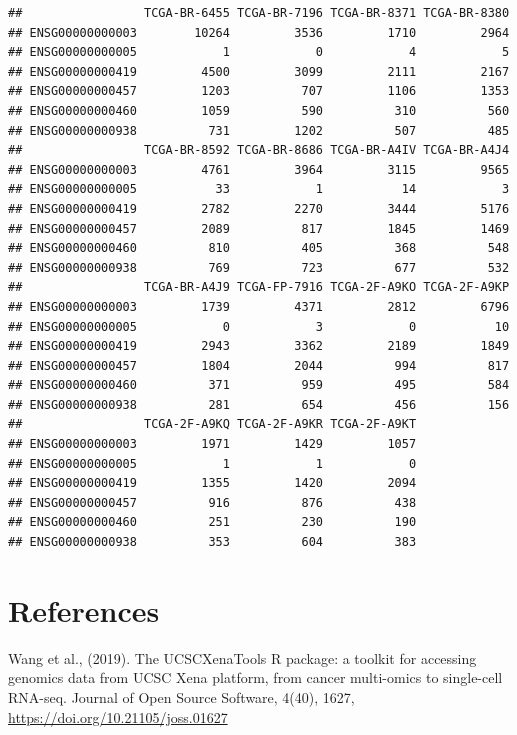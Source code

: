 \documentclass[
  12pt,
]{book}
\begin{document}
\begin{verbatim}
##                 TCGA-BR-6455 TCGA-BR-7196 TCGA-BR-8371 TCGA-BR-8380
## ENSG00000000003        10264         3536         1710         2964
## ENSG00000000005            1            0            4            5
## ENSG00000000419         4500         3099         2111         2167
## ENSG00000000457         1203          707         1106         1353
## ENSG00000000460         1059          590          310          560
## ENSG00000000938          731         1202          507          485
##                 TCGA-BR-8592 TCGA-BR-8686 TCGA-BR-A4IV TCGA-BR-A4J4
## ENSG00000000003         4761         3964         3115         9565
## ENSG00000000005           33            1           14            3
## ENSG00000000419         2782         2270         3444         5176
## ENSG00000000457         2089          817         1845         1469
## ENSG00000000460          810          405          368          548
## ENSG00000000938          769          723          677          532
##                 TCGA-BR-A4J9 TCGA-FP-7916 TCGA-2F-A9KO TCGA-2F-A9KP
## ENSG00000000003         1739         4371         2812         6796
## ENSG00000000005            0            3            0           10
## ENSG00000000419         2943         3362         2189         1849
## ENSG00000000457         1804         2044          994          817
## ENSG00000000460          371          959          495          584
## ENSG00000000938          281          654          456          156
##                 TCGA-2F-A9KQ TCGA-2F-A9KR TCGA-2F-A9KT
## ENSG00000000003         1971         1429         1057
## ENSG00000000005            1            1            0
## ENSG00000000419         1355         1420         2094
## ENSG00000000457          916          876          438
## ENSG00000000460          251          230          190
## ENSG00000000938          353          604          383
\end{verbatim}

\hypertarget{references}{%
\section{References}\label{references}}

Wang et al., (2019). The UCSCXenaTools R package: a toolkit for accessing genomics data from UCSC Xena platform, from cancer multi-omics to single-cell RNA-seq. Journal of Open Source Software, 4(40), 1627, \url{https://doi.org/10.21105/joss.01627}
\end{document}
